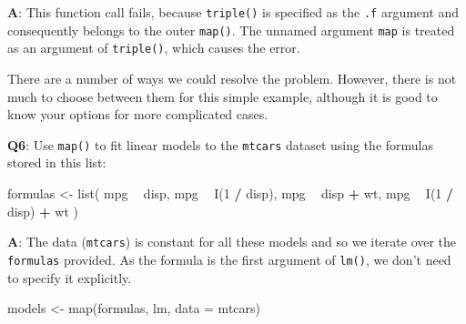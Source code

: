 \documentclass[
]{krantz}
\makeatletter
\newenvironment{Shaded}{\begin{snugshade}}{\end{snugshade}}
\newcommand{\CommentTok}[1]{\textcolor[rgb]{0.56,0.35,0.01}{\textit{#1}}}
\newcommand{\DataTypeTok}[1]{\textcolor[rgb]{0.13,0.29,0.53}{#1}}
\newcommand{\DecValTok}[1]{\textcolor[rgb]{0.00,0.00,0.81}{#1}}
\newcommand{\KeywordTok}[1]{\textcolor[rgb]{0.13,0.29,0.53}{\textbf{#1}}}
\newcommand{\NormalTok}[1]{#1}
\newcommand{\OperatorTok}[1]{\textcolor[rgb]{0.81,0.36,0.00}{\textbf{#1}}}
\newcommand{\StringTok}[1]{\textcolor[rgb]{0.31,0.60,0.02}{#1}}
\newenvironment{kframe}{%
\medskip{}
\setlength{\fboxsep}{.8em}
 \def\at@end@of@kframe{}%
 \ifinner\ifhmode%
  \def\at@end@of@kframe{\end{minipage}}%
  \begin{minipage}{\columnwidth}%
 \fi\fi%
 \def\FrameCommand##1{\hskip\@totalleftmargin \hskip-\fboxsep
 \colorbox{shadecolor}{##1}\hskip-\fboxsep
     \hskip-\linewidth \hskip-\@totalleftmargin \hskip\columnwidth}%
 \MakeFramed {\advance\hsize-\width
   \@totalleftmargin\z@ \linewidth\hsize
   \@setminipage}}%
 {\par\unskip\endMakeFramed%
 \at@end@of@kframe}
\renewenvironment{Shaded}{\begin{kframe}}{\end{kframe}}
\renewcommand{\KeywordTok} [1]{\textcolor[rgb]{0.00,0.44,0.13}{{#1}}}
\renewcommand{\DataTypeTok}[1]{\textcolor[rgb]{0.56,0.13,0.00}{{#1}}}
\renewcommand{\DecValTok}  [1]{\textcolor[rgb]{0.25,0.63,0.44}{{#1}}}
\renewcommand{\StringTok}  [1]{\textcolor[rgb]{0.25,0.44,0.63}{{#1}}}
\renewcommand{\CommentTok} [1]{\textcolor[rgb]{0.38,0.63,0.69}{{#1}}}
\renewcommand{\NormalTok}  [1]{{#1}}
\makeatother
\begin{document}
\textbf{{A}}: This function call fails, because \texttt{triple()} is specified as the \texttt{.f} argument and consequently belongs to the outer \texttt{map()}. The unnamed argument \texttt{map} is treated as an argument of \texttt{triple()}, which causes the error.

There are a number of ways we could resolve the problem. However, there is not much to choose between them for this simple example, although it is good to know your options for more complicated cases.

\begin{Shaded}
\end{Shaded}

\textbf{{Q6}}: Use \texttt{map()} to fit linear models to the \texttt{mtcars} dataset using the formulas stored in this list:

\begin{Shaded}
\begin{Highlighting}[]
\NormalTok{formulas <-}\StringTok{ }\KeywordTok{list}\NormalTok{(}
\NormalTok{  mpg }\OperatorTok{~}\StringTok{ }\NormalTok{disp,}
\NormalTok{  mpg }\OperatorTok{~}\StringTok{ }\KeywordTok{I}\NormalTok{(}\DecValTok{1} \OperatorTok{/}\StringTok{ }\NormalTok{disp),}
\NormalTok{  mpg }\OperatorTok{~}\StringTok{ }\NormalTok{disp }\OperatorTok{+}\StringTok{ }\NormalTok{wt,}
\NormalTok{  mpg }\OperatorTok{~}\StringTok{ }\KeywordTok{I}\NormalTok{(}\DecValTok{1} \OperatorTok{/}\StringTok{ }\NormalTok{disp) }\OperatorTok{+}\StringTok{ }\NormalTok{wt}
\NormalTok{)}
\end{Highlighting}
\end{Shaded}

\textbf{{A}}: The data (\texttt{mtcars}) is constant for all these models and so we iterate over the \texttt{formulas} provided. As the formula is the first argument of \texttt{lm()}, we don't need to specify it explicitly.

\begin{Shaded}
\begin{Highlighting}[]
\NormalTok{models <-}\StringTok{ }\KeywordTok{map}\NormalTok{(formulas, lm, }\DataTypeTok{data =}\NormalTok{ mtcars)}
\end{Highlighting}
\end{Shaded}
\end{document}
